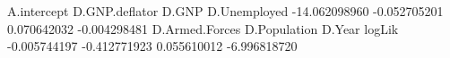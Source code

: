 \begin{Schunk}
\begin{Soutput}
   A.intercept D.GNP.deflator          D.GNP   D.Unemployed 
 -14.062098960   -0.052705201    0.070642032   -0.004298481 
D.Armed.Forces   D.Population         D.Year         logLik 
  -0.005744197   -0.412771923    0.055610012   -6.996818720 
\end{Soutput}
\end{Schunk}
